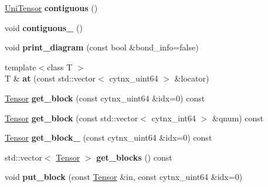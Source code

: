 \begin{DoxyCompactItemize}
\item 
\mbox{\label{classcytnx_1_1UniTensor_a450c62c231335103f723b96d0c08d18f}} 
\hyperlink{classcytnx_1_1UniTensor}{Uni\+Tensor} {\bfseries contiguous} ()
\item 
\mbox{\label{classcytnx_1_1UniTensor_a80a6e52a909c02c577ebeeb815f93ebf}} 
void {\bfseries contiguous\+\_\+} ()
\item 
\mbox{\label{classcytnx_1_1UniTensor_a685061555097873eb172381059fda92b}} 
void {\bfseries print\+\_\+diagram} (const bool \&bond\+\_\+info=false)
\item 
\mbox{\label{classcytnx_1_1UniTensor_a432b37f45cd8a87ceefd45eb2d8e6330}} 
{\footnotesize template$<$class T $>$ }\\T \& {\bfseries at} (const std\+::vector$<$ cytnx\+\_\+uint64 $>$ \&locator)
\item 
\mbox{\label{classcytnx_1_1UniTensor_a7d4df6dffeca0fd8eafdb9d766813f84}} 
\hyperlink{classcytnx_1_1Tensor}{Tensor} {\bfseries get\+\_\+block} (const cytnx\+\_\+uint64 \&idx=0) const
\item 
\mbox{\label{classcytnx_1_1UniTensor_a9d08b8f666a998f435ccc2ac96e6c7e5}} 
\hyperlink{classcytnx_1_1Tensor}{Tensor} {\bfseries get\+\_\+block} (const std\+::vector$<$ cytnx\+\_\+int64 $>$ \&qnum) const
\item 
\mbox{\label{classcytnx_1_1UniTensor_a216d54f936554fa11b1edaff968d69d4}} 
\hyperlink{classcytnx_1_1Tensor}{Tensor} {\bfseries get\+\_\+block\+\_\+} (const cytnx\+\_\+uint64 \&idx=0) const
\item 
\mbox{\label{classcytnx_1_1UniTensor_a661bc7073dc51b16a4b9802bbcc3cba2}} 
std\+::vector$<$ \hyperlink{classcytnx_1_1Tensor}{Tensor} $>$ {\bfseries get\+\_\+blocks} () const
\item 
\mbox{\label{classcytnx_1_1UniTensor_abcd3008bf05771f0623ce1ef80b1085a}} 
void {\bfseries put\+\_\+block} (const \hyperlink{classcytnx_1_1Tensor}{Tensor} \&in, const cytnx\+\_\+uint64 \&idx=0)

\end{DoxyCompactItemize}
